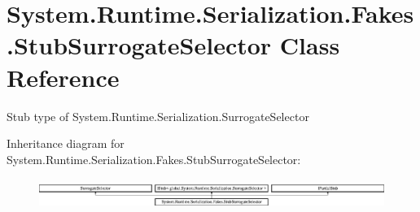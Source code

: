 \hypertarget{class_system_1_1_runtime_1_1_serialization_1_1_fakes_1_1_stub_surrogate_selector}{\section{System.\-Runtime.\-Serialization.\-Fakes.\-Stub\-Surrogate\-Selector Class Reference}
\label{class_system_1_1_runtime_1_1_serialization_1_1_fakes_1_1_stub_surrogate_selector}
}


Stub type of System.\-Runtime.\-Serialization.\-Surrogate\-Selector 


Inheritance diagram for System.\-Runtime.\-Serialization.\-Fakes.\-Stub\-Surrogate\-Selector\-:\begin{figure}[H]
\begin{center}
\leavevmode
\includegraphics[height=0.987654cm]{class_system_1_1_runtime_1_1_serialization_1_1_fakes_1_1_stub_surrogate_selector}
\end{center}
\end{figure}
